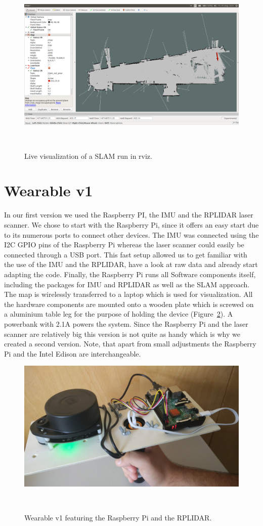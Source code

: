 \documentclass{sigchi-ext}
\begin{document}
\begin{figure}
  \includegraphics[width=\textwidth]{101.png}
  \caption{Live visualization of a SLAM run in rviz.}~\label{fig:software}
\end{figure}

\section{Wearable v1}
In our first version we used the Raspberry PI, the IMU and the RPLIDAR laser scanner. We chose to start with the Raspberry Pi, since it offers an easy start due to its numerous ports to connect other devices. The IMU was connected using the I2C GPIO pins of the Raspberry Pi whereas the laser scanner could easily be connected through a USB port. This fast setup allowed us to get familiar with the use of the IMU and the RPLIDAR, have a look at raw data and already start adapting the code. Finally, the Raspberry Pi runs all Software components itself, including the packages for IMU and RPLIDAR as well as the SLAM approach. The map is wirelessly transferred to a laptop which is used for visualization. All the hardware components are mounted onto a wooden plate which is screwed on a aluminium table leg for the purpose of holding the device (Figure~\ref{fig:v1}). A powerbank with 2.1A powers the system. Since the Raspberry Pi and the laser scanner are relatively big this version is not quite as handy which is why we created a second version. Note, that apart from small adjustments the Raspberry Pi and the Intel Edison are interchangeable.

\begin{figure}
  \includegraphics[width=0.9\columnwidth]{pi-lidar.jpg}
  \caption{Wearable v1 featuring the Raspberry Pi and the RPLIDAR.}~\label{fig:v1}
\end{figure}
\end{document}
